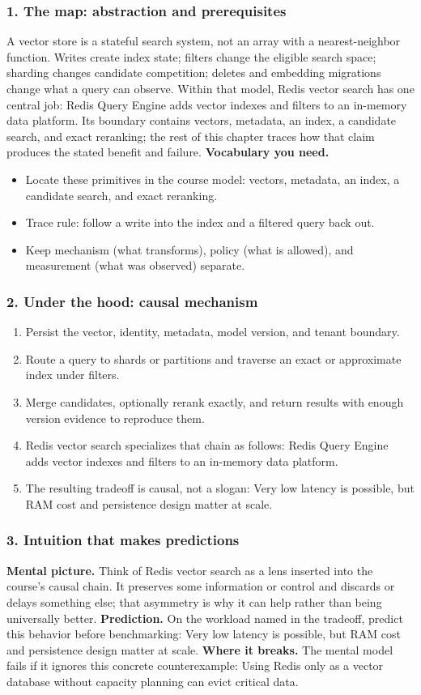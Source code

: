 \subsubsection*{1. The map: abstraction and prerequisites}
A vector store is a stateful search system, not an array with a nearest-neighbor function. Writes create index state; filters change the eligible search space; sharding changes candidate competition; deletes and embedding migrations change what a query can observe.
Within that model, Redis vector search has one central job: Redis Query Engine adds vector indexes and filters to an in-memory data platform. Its boundary contains vectors, metadata, an index, a candidate search, and exact reranking; the rest of this chapter traces how that claim produces the stated benefit and failure.
\textbf{Vocabulary you need.}\begin{itemize}
\item Locate these primitives in the course model: vectors, metadata, an index, a candidate search, and exact reranking.
\item Trace rule: follow a write into the index and a filtered query back out.
\item Keep mechanism (what transforms), policy (what is allowed), and measurement (what was observed) separate.
\end{itemize}
\subsubsection*{2. Under the hood: causal mechanism}\begin{enumerate}
\item Persist the vector, identity, metadata, model version, and tenant boundary.
\item Route a query to shards or partitions and traverse an exact or approximate index under filters.
\item Merge candidates, optionally rerank exactly, and return results with enough version evidence to reproduce them.
\item Redis vector search specializes that chain as follows: Redis Query Engine adds vector indexes and filters to an in-memory data platform.
\item The resulting tradeoff is causal, not a slogan: Very low latency is possible, but RAM cost and persistence design matter at scale.
\end{enumerate}
\subsubsection*{3. Intuition that makes predictions}
\textbf{Mental picture.} Think of Redis vector search as a lens inserted into the course's causal chain. It preserves some information or control and discards or delays something else; that asymmetry is why it can help rather than being universally better.
\textbf{Prediction.} On the workload named in the tradeoff, predict this behavior before benchmarking: Very low latency is possible, but RAM cost and persistence design matter at scale.
\textbf{Where it breaks.} The mental model fails if it ignores this concrete counterexample: Using Redis only as a vector database without capacity planning can evict critical data.
